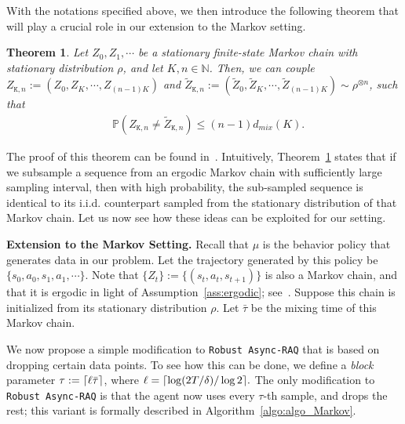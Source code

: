 \documentclass{article}
\DeclarePairedDelimiter{\ceil}{\lceil}{\rceil}
\newtheorem{theorem}{Theorem}
\begin{document}
With the notations specified above, we then introduce the following theorem that will play a crucial role in our extension to the Markov setting. 
\begin{theorem}\label{thm:coupling}
    Let $Z_0,Z_1,\cdots$ be a stationary finite-state Markov chain with stationary distribution $\rho$, and let $K,n\in\mathbb{N}$. Then, we can couple $Z_{\texttt{K},n}:= (Z_0,Z_{K},\cdots, Z_{(n-1)K})$ and $\tilde{Z}_{\texttt{K},n}:=(\tilde Z_0,\tilde Z_{K},\cdots, \tilde Z_{(n-1)K})\sim\rho^{\otimes n}$, such that
    \begin{equation}
    \begin{aligned}
        &\mathbb{P}\left(Z_{\texttt{K},n} \neq \tilde{Z}_{\texttt{K},n}\right) \leq (n-1) d_{mix}(K).
    \end{aligned}
    \end{equation}
\end{theorem}
The proof of this theorem can be found in~\citet{nagaraj}. Intuitively, Theorem~\ref{thm:coupling} states that if we subsample a sequence from an ergodic Markov chain with sufficiently large sampling interval, then with high probability, the sub-sampled sequence is identical to its i.i.d.  counterpart sampled from the stationary distribution of that Markov chain. Let us now see how these ideas can be exploited for our setting. 

\textbf{Extension to the Markov Setting.} Recall that $\mu$ is the behavior policy that generates data in our problem. Let the trajectory generated by this policy be $\{s_{0},a_{0},s_{1},a_{1},\cdots\}$. Note that $\{Z_{t}\}:=\{(s_{t},a_{t},s_{t+1})\}$ is also a Markov chain, and that it is ergodic in light of Assumption~\ref{ass:ergodic}; see~\citet{chenQ}. Suppose this chain is initialized from its stationary distribution $\rho$.  Let $\bar\tau$ be the mixing time of this Markov chain.

We now propose a simple modification to \texttt{Robust Async-RAQ} that is based on dropping certain data points. To see how this can be done, we define a \emph{block} parameter $\tau := \ceil{\ell \bar{\tau}}$, where $\ell =\ceil{\log(2T/\delta)/\log 2}.$ The only modification to \texttt{Robust Async-RAQ} is that the agent now uses every $\tau$-th sample, and drops the rest; this variant is formally described in Algorithm~\ref{algo:algo_Markov}. 
\end{document}
